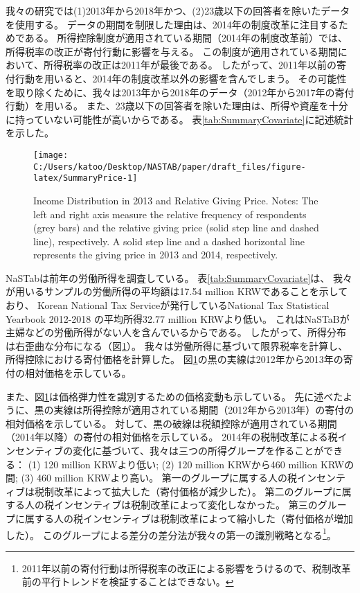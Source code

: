 \documentclass[
  11pt,
  a4paper,
]{article}
\begin{document}
我々の研究では(1)2013年から2018年かつ、(2)23歳以下の回答者を除いたデータを使用する。
データの期間を制限した理由は、2014年の制度改革に注目するためである。
所得控除制度が適用されている期間（2014年の制度改革前）では、所得税率の改正が寄付行動に影響を与える。
この制度が適用されている期間において、所得税率の改正は2011年が最後である。
したがって、2011年以前の寄付行動を用いると、2014年の制度改革以外の影響を含んでしまう。
その可能性を取り除くために、我々は2013年から2018年のデータ（2012年から2017年の寄付行動）を用いる。
また、23歳以下の回答者を除いた理由は、所得や資産を十分に持っていない可能性が高いからである。
表\ref{tab:SummaryCovariate}に記述統計を示した。

\begin{figure}[t]

{\centering \texttt{[image: C:/Users/katoo/Desktop/NASTAB/paper/draft\_files/figure-latex/SummaryPrice-1]} 

}

\caption{Income Distribution in 2013 and Relative Giving Price. Notes: The left and right axis measure the relative frequency of respondents (grey bars) and the relative giving price (solid step line and dashed line), respectively. A solid step line and a dashed horizontal line represents the giving price in 2013 and 2014, respectively.}\label{fig:SummaryPrice}
\end{figure}

NaSTabは前年の労働所得を調査している。
表\ref{tab:SummaryCovariate}は、
我々が用いるサンプルの労働所得の平均額は17.54 million KRWであることを示しており、
Korean National Tax Serviceが発行しているNational Tax Statistical Yearbook 2012-2018
の平均所得32.77 million KRWより低い。
これはNaSTaBが主婦などの労働所得がない人を含んでいるからである。
したがって、所得分布は右歪曲な分布になる（図\ref{fig:SummaryPrice}）。
我々は労働所得に基づいて限界税率を計算し、所得控除における寄付価格を計算した。
図\ref{fig:SummaryPrice}の黒の実線は2012年から2013年の寄付の相対価格を示している。

また、図\ref{fig:SummaryPrice}は価格弾力性を識別するための価格変動も示している。
先に述べたように、黒の実線は所得控除が適用されている期間（2012年から2013年）の寄付の相対価格を示している。
対して、黒の破線は税額控除が適用されている期間（2014年以降）の寄付の相対価格を示している。
2014年の税制改革による税インセンティブの変化に基づいて、我々は三つの所得グループを作ることができる：
(1) 120 million KRWより低い;
(2) 120 million KRWから460 million KRWの間;
(3) 460 million KRWより高い。
第一のグループに属する人の税インセンティブは税制改革によって拡大した（寄付価格が減少した）。
第二のグループに属する人の税インセンティブは税制改革によって変化しなかった。
第三のグループに属する人の税インセンティブは税制改革によって縮小した（寄付価格が増加した）。
このグループによる差分の差分法が我々の第一の識別戦略となる\footnote{2011年以前の寄付行動は所得税率の改正による影響をうけるので、税制改革前の平行トレンドを検証することはできない。}。
\end{document}
